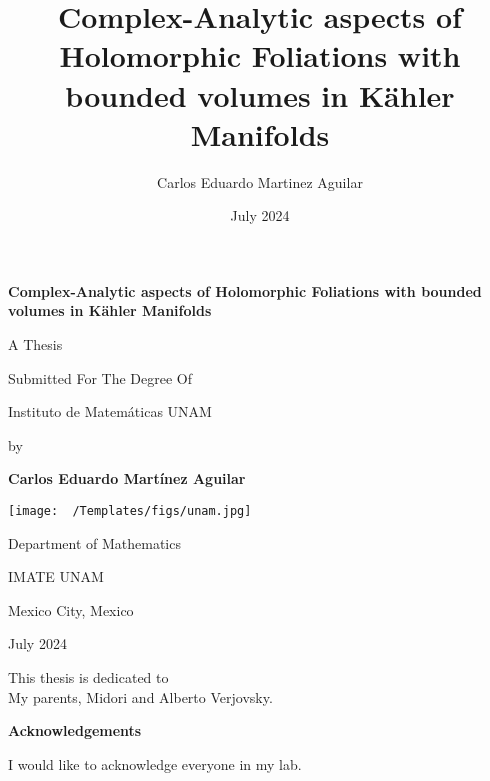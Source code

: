 \documentclass[12pt,twoside,a4paper]{report}
\author{Carlos Eduardo Martinez Aguilar}
\title{Complex-Analytic aspects of Holomorphic Foliations with bounded volumes in Kähler Manifolds}
\date{July 2024}
\newcommand{\thesistitle}{Complex-Analytic aspects of Holomorphic Foliations with bounded volumes in Kähler Manifolds}
\newcommand{\myname}{Carlos Eduardo Martínez Aguilar}
\newcommand{\thesisdate}{July 2024}
\begin{document}
\begin{titlepage}
    \centering
     {\huge \textbf{\thesistitle} \par}
      \vspace{2cm}
     {\large \sc A Thesis \par}
      \vspace{0.2cm}
     {\large \sc Submitted For The Degree Of \par}
     \vspace{0.2cm}
      {\large {} \par} 
     \vspace{0.2cm}
     {\large \sc Instituto de Matemáticas UNAM  \par}
     \vspace{1cm}
     {\large  by \par}
     \vspace{0.5cm}
     {\large \textbf{\myname} \par}
     \vspace{0.5cm}
    \texttt{[image: ~/Templates/figs/unam.jpg]}\\ %
    \vspace{2cm}
    {\large \sc Department of Mathematics \par}
     {\large \sc IMATE UNAM  \par}
     {\large \sc Mexico City, Mexico \par}
    \vspace{0.5cm}
    {\large \sc \thesisdate \par}
    \vspace{2cm}
\end{titlepage}

\clearpage
\thispagestyle{empty}

\clearpage
\thispagestyle{empty}
\begin{center}
    \vspace*{\fill}
    This thesis is dedicated to\\
    My parents, Midori and Alberto Verjovsky.
    \vspace*{\fill}
\end{center}
\clearpage


\clearpage
\thispagestyle{plain}
\begin{center} 
    \huge\textbf{Acknowledgements}\\
\end{center}
    \normalsize
    I would like to acknowledge everyone in my lab.
\clearpage
\end{document}
